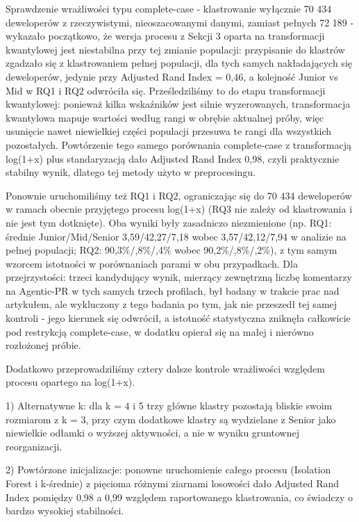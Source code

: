 Sprawdzenie wrażliwości typu complete-case - klastrowanie wyłącznie 70 434 deweloperów z rzeczywistymi, nieoszacowanymi danymi, zamiast pełnych 72 189 - wykazało początkowo, że wersja procesu z Sekcji 3 oparta na transformacji kwantylowej jest niestabilna przy tej zmianie populacji: przypisanie do klastrów zgadzało się z klastrowaniem pełnej populacji, dla tych samych nakładających się deweloperów, jedynie przy Adjusted Rand Index = 0,46, a kolejność Junior vs Mid w RQ1 i RQ2 odwróciła się. Prześledziliśmy to do etapu transformacji kwantylowej: ponieważ kilka wskaźników jest silnie wyzerowanych, transformacja kwantylowa mapuje wartości według rangi w obrębie aktualnej próby, więc usunięcie nawet niewielkiej części populacji przesuwa te rangi dla wszystkich pozostałych. Powtórzenie tego samego porównania complete-case z transformacją log(1+x) plus standaryzacją dało Adjusted Rand Index 0,98, czyli praktycznie stabilny wynik, dlatego tej metody użyto w preprocesingu.

Ponownie uruchomiliśmy też RQ1 i RQ2, ograniczając się do 70 434 deweloperów w ramach obecnie przyjętego procesu log(1+x) (RQ3 nie zależy od klastrowania i nie jest tym dotknięte). Oba wyniki były zasadniczo niezmienione (np. RQ1: średnie Junior/Mid/Senior 3,59/42,27/7,18 wobec 3,57/42,12/7,94 w analizie na pełnej populacji; RQ2: 90,3\%/,8\%/,4\% wobec 90,2\%/,8\%/,2\%), z tym samym wzorcem istotności w porównaniach parami w obu przypadkach. Dla przejrzystości: trzeci kandydujący wynik, mierzący zewnętrzną liczbę komentarzy na Agentic-PR w tych samych trzech profilach, był badany w trakcie prac nad artykułem, ale wykluczony z tego badania po tym, jak nie przeszedł tej samej kontroli - jego kierunek się odwrócił, a istotność statystyczna zniknęła całkowicie pod restrykcją complete-case, w dodatku opierał się na małej i nierówno rozłożonej próbie.

Dodatkowo przeprowadziliśmy cztery dalsze kontrole wrażliwości względem procesu opartego na log(1+x).

1) Alternatywne k: dla k = 4 i 5 trzy główne klastry pozostają bliskie swoim rozmiarom z k = 3, przy czym dodatkowe klastry są wydzielane z Senior jako niewielkie odłamki o wyższej aktywności, a nie w wyniku gruntownej reorganizacji.

2) Powtórzone inicjalizacje: ponowne uruchomienie całego procesu (Isolation Forest i k-średnie) z pięcioma różnymi ziarnami losowości dało Adjusted Rand Index pomiędzy 0,98 a 0,99 względem raportowanego klastrowania, co świadczy o bardzo wysokiej stabilności.

